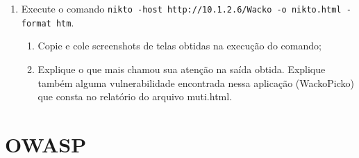 \documentclass{article}
\begin{document}
    \begin{superframe}
        \begin{enumerate}
            \item Execute o comando \texttt{nikto -host http://10.1.2.6/Wacko -o nikto.html -format htm}.
                \begin{enumerate}
                    \item Copie e cole screenshots de telas obtidas na execução do
                        comando;
                    \item Explique o que mais chamou sua atenção na saída obtida.
                        Explique também alguma vulnerabilidade encontrada nessa
                        aplicação (WackoPicko) que consta no relatório do arquivo
                        muti.html.
                \end{enumerate}
        \end{enumerate}
    \end{superframe}

    \section{OWASP}
\end{document}
